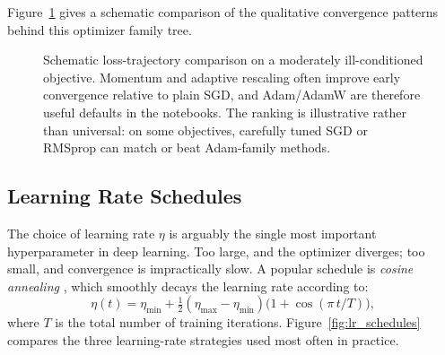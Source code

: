 \documentclass[11pt,a4paper]{report}
\begin{document}
Figure~\ref{fig:optimizer_trajectories} gives a schematic comparison of the qualitative convergence patterns behind this optimizer family tree.

\begin{figure}[ht]
\centering
{}
\caption{Schematic loss-trajectory comparison on a moderately ill-conditioned objective.  Momentum and adaptive rescaling often improve early convergence relative to plain SGD, and Adam/AdamW are therefore useful defaults in the notebooks.  The ranking is illustrative rather than universal: on some objectives, carefully tuned SGD or RMSprop can match or beat Adam-family methods.}
\label{fig:optimizer_trajectories}
\end{figure}

\subsection{Learning Rate Schedules}

The choice of learning rate $\eta$ is arguably the single most important hyperparameter in deep learning.  Too large, and the optimizer diverges; too small, and convergence is impractically slow.  A popular schedule is \emph{cosine annealing} \citep{loshchilov2017sgdr}, which smoothly decays the learning rate according to:
\begin{equation}
\eta(t) = \eta_{\min} + \tfrac{1}{2}(\eta_{\max} - \eta_{\min})\bigl(1 + \cos(\pi\, t / T)\bigr),
\end{equation}
where $T$ is the total number of training iterations.  Figure~\ref{fig:lr_schedules} compares the three learning-rate strategies used most often in practice.
\end{document}
